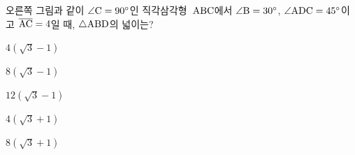 \noindent\begin{minipage}[t]{0.58\linewidth}\vspace{0pt}\raggedright 오른쪽 그림과 같이 $\angle\mathrm{C}=90^\circ$인 직각삼각형~$\mathrm{ABC}$에서 $\angle\mathrm{B}=30^\circ$, $\angle\mathrm{ADC}=45^\circ$이고 $\overline{\mathrm{AC}}=4$일 때, $\triangle\mathrm{ABD}$의 넓이는?\end{minipage}\hfill\begin{minipage}[t]{0.4\linewidth}\vspace{0pt}\centering \resizebox{\ifdim\width>\linewidth\linewidth\else\width\fi}{!}{}\end{minipage}\par
\begin{choices32}{\rule[-3ex]{0pt}{8ex}$4(\sqrt{3}-1)$}{\rule[-3ex]{0pt}{8ex}$8(\sqrt{3}-1)$}{\rule[-3ex]{0pt}{8ex}$12(\sqrt{3}-1)$}{\rule[-3ex]{0pt}{8ex}$4(\sqrt{3}+1)$}{\rule[-3ex]{0pt}{8ex}$8(\sqrt{3}+1)$}\end{choices32}
